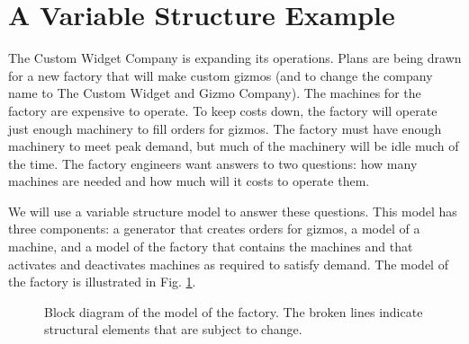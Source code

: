 \section{A Variable Structure Example}
The Custom Widget Company is expanding its operations. Plans are being drawn for a new factory that will make custom gizmos (and to change the company name to The Custom Widget and Gizmo Company). The machines for the factory are expensive to operate. To keep costs down, the factory will operate just enough machinery to fill orders for gizmos. The factory must have enough machinery to meet peak demand, but much of the machinery will be idle much of the time. The factory engineers want answers to two questions: how many machines are needed and how much will it costs to operate them.

We will use a variable structure model to answer these questions. This model has three components: a generator that creates orders for gizmos, a model of a machine, and a model of the factory that contains the machines and that activates and deactivates machines as required to satisfy demand. The model of the factory is illustrated in Fig. \ref{fig:factory_model}.
\begin{figure}[ht]
\centering
{}
\caption{Block diagram of the model of the factory. The broken lines indicate structural elements that are subject to change.}
\label{fig:factory_model}
\end{figure}

